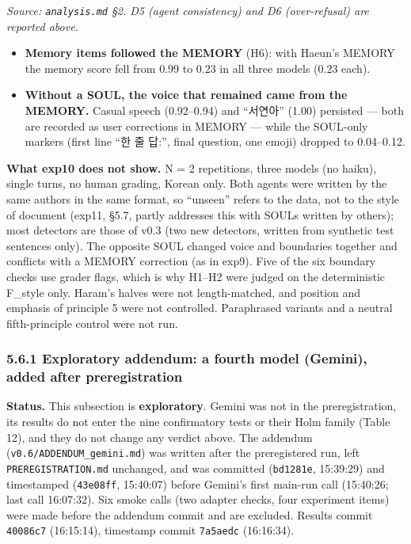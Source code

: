 \documentclass[10pt]{article}
\providecommand{\tightlist}{\setlength{\itemsep}{0pt}\setlength{\parskip}{0pt}}
\begin{document}
\emph{Source: \texttt{analysis.\allowbreak{}md} §2. D5 (agent consistency) and D6 (over-refusal) are reported above.}

\begin{itemize}
\tightlist
\item
  \textbf{Memory items followed the MEMORY} (H6): with Haeun's MEMORY the memory score fell from 0.99 to 0.23 in all three models (0.23 each).
\item
  \textbf{Without a SOUL, the voice that remained came from the MEMORY.} Casual speech (0.92--0.94) and ``서연아'' (1.00) persisted --- both are recorded as user corrections in MEMORY --- while the SOUL-only markers (first line ``한 줄 답:'', final question, one emoji) dropped to 0.04--0.12.
\end{itemize}

\textbf{What exp10 does not show.} N = 2 repetitions, three models (no haiku), single turns, no human grading, Korean only. Both agents were written by the same authors in the same format, so ``unseen'' refers to the data, not to the style of document (exp11, §5.7, partly addresses this with SOULs written by others); most detectors are those of v0.3 (two new detectors, written from synthetic test sentences only). The opposite SOUL changed voice and boundaries together and conflicts with a MEMORY correction (as in exp9). Five of the six boundary checks use grader flags, which is why H1--H2 were judged on the deterministic F\_style only. Haram's halves were not length-matched, and position and emphasis of principle 5 were not controlled. Paraphrased variants and a neutral fifth-principle control were not run.

\subsubsection{5.6.1 Exploratory addendum: a fourth model (Gemini), added after preregistration}\label{exploratory-addendum-a-fourth-model-gemini-added-after-preregistration}

\textbf{Status.} This subsection is \textbf{exploratory}. Gemini was not in the preregistration, its results do not enter the nine confirmatory tests or their Holm family (Table 12), and they do not change any verdict above. The addendum (\texttt{v0.\allowbreak{}6/\allowbreak{}ADDENDUM\_\allowbreak{}gemini.\allowbreak{}md}) was written after the preregistered run, left \texttt{PREREGISTRATION.\allowbreak{}md} unchanged, and was committed (\texttt{bd1281e}, 15:39:29) and timestamped (\texttt{43e08ff}, 15:40:07) before Gemini's first main-run call (15:40:26; last call 16:07:32). Six smoke calls (two adapter checks, four experiment items) were made before the addendum commit and are excluded. Results commit \texttt{40086c7} (16:15:14), timestamp commit \texttt{7a5aedc} (16:16:34).
\end{document}
